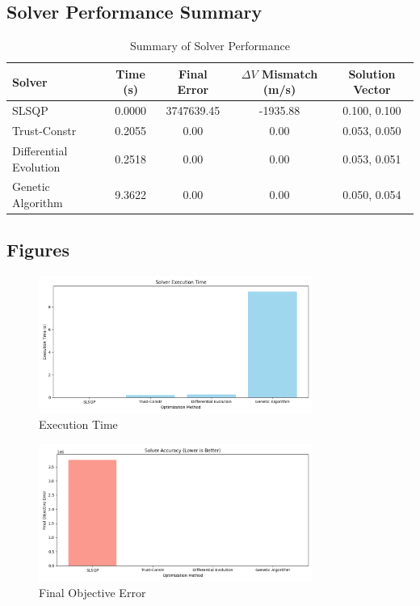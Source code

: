 \documentclass{article}
\begin{document}
\subsection*{Solver Performance Summary}
\begin{table}[ht]
\centering
\begin{tabular}{lcccc}
\toprule
\textbf{Solver} & \textbf{Time (s)} & \textbf{Final Error} & \textbf{$\Delta V$ Mismatch (m/s)} & \textbf{Solution Vector} \\
\midrule
SLSQP & 0.0000 & 3747639.45 & -1935.88 & 0.100, 0.100 \\
Trust-Constr & 0.2055 & 0.00 & 0.00 & 0.053, 0.050 \\
Differential Evolution & 0.2518 & 0.00 & 0.00 & 0.053, 0.051 \\
Genetic Algorithm & 9.3622 & 0.00 & 0.00 & 0.050, 0.054 \\
\bottomrule
\end{tabular}
\caption{Summary of Solver Performance}
\end{table}

\subsection*{Figures}

\begin{figure}[ht]
\centering
\includegraphics[width=0.8\textwidth]{execution_time.png}
\caption{Execution Time}
\end{figure}

\begin{figure}[ht]
\centering
\includegraphics[width=0.8\textwidth]{objective_error.png}
\caption{Final Objective Error}
\end{figure}
\end{document}
